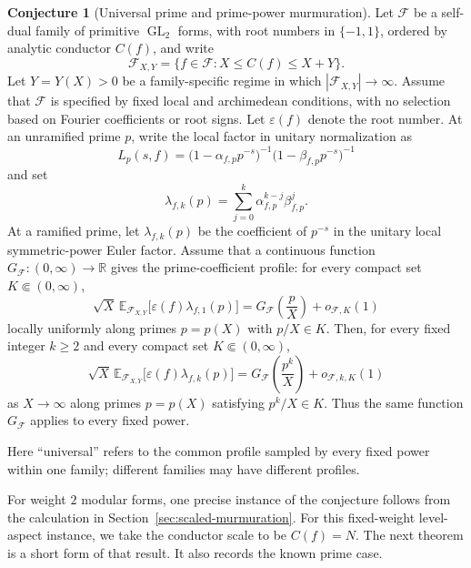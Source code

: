 \documentclass[12pt,reqno]{amsart}
\numberwithin{equation}{section}
\theoremstyle{plain}
\theoremstyle{definition}
\newtheorem{conjecture}[theorem]{Conjecture}
\theoremstyle{remark}
\newcommand{\GL}{\operatorname{GL}}
\begin{document}
\begin{conjecture}[Universal prime and prime-power murmuration]
\label{conjUniversal}
Let $\mathcal F$ be a self-dual family of primitive $\GL_2$ forms, with root numbers in $\{-1,1\}$, ordered by analytic conductor $C(f)$, and write
\begin{equation*}
\mathcal F_{X,Y}=\{f\in\mathcal F:X\leq C(f)\leq X+Y\}.
\end{equation*}
Let $Y=Y(X)>0$ be a family-specific regime in which $|\mathcal F_{X,Y}|\to\infty$.
Assume that $\mathcal F$ is specified by fixed local and archimedean conditions, with no selection based on Fourier coefficients or root signs.
Let $\varepsilon(f)$ denote the root number.  At an unramified prime $p$, write the local factor in unitary normalization as
\begin{equation*}
L_p(s,f)=\bigl(1-\alpha_{f,p}p^{-s}\bigr)^{-1}
\bigl(1-\beta_{f,p}p^{-s}\bigr)^{-1}
\end{equation*}
and set
\begin{equation*}
\lambda_{f,k}(p)=\sum_{j=0}^{k}
\alpha_{f,p}^{k-j}\beta_{f,p}^{j}.
\end{equation*}
At a ramified prime, let $\lambda_{f,k}(p)$ be the coefficient of $p^{-s}$ in the unitary local symmetric-power Euler factor.
Assume that a continuous function $G_{\mathcal F}:(0,\infty)\to\mathbb R$ gives the prime-coefficient profile: for every compact set $K\Subset(0,\infty)$,
\begin{equation*}
\sqrt X\,
\mathbb E_{\mathcal F_{X,Y}}
\bigl[\varepsilon(f)\lambda_{f,1}(p)\bigr]
=
G_{\mathcal F}\left(\frac pX\right)+o_{\mathcal F,K}(1)
\end{equation*}
locally uniformly along primes $p=p(X)$ with $p/X\in K$.
Then, for every fixed integer $k\geq2$ and every compact set $K\Subset(0,\infty)$,
\begin{equation*}
\sqrt X\,
\mathbb E_{\mathcal F_{X,Y}}
\bigl[\varepsilon(f)\lambda_{f,k}(p)\bigr]
=
G_{\mathcal F}\left(\frac{p^k}{X}\right)+o_{\mathcal F,k,K}(1)
\end{equation*}
as $X\to\infty$ along primes $p=p(X)$ satisfying $p^k/X\in K$.
Thus the same function $G_{\mathcal F}$ applies to every fixed power.
\end{conjecture}

Here ``universal'' refers to the common profile sampled by every fixed power within one family; different families may have different profiles.

For weight $2$ modular forms, one precise instance of the conjecture follows from the calculation in
Section~\ref{sec:scaled-murmuration}.
For this fixed-weight level-aspect instance, we take the conductor scale to be $C(f)=N$.
The next theorem is a short form of that result.
It also records the known prime case.
\end{document}
